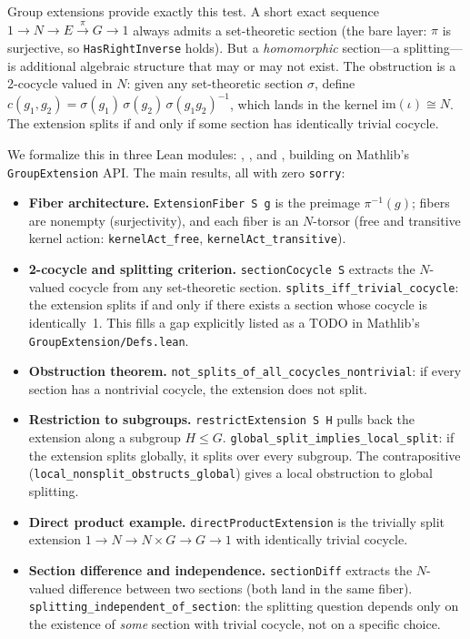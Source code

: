 \documentclass[11pt]{article}
\begin{document}
Group extensions provide exactly this test. A short exact sequence
$1 \to N \to E \xrightarrow{\pi} G \to 1$ always admits a set-theoretic section
(the bare layer: $\pi$ is surjective, so \texttt{HasRightInverse} holds). But a
\emph{homomorphic} section---a splitting---is additional algebraic structure that may or may
not exist. The obstruction is a 2-cocycle valued in $N$: given any set-theoretic section
$\sigma$, define $c(g_1,g_2) = \sigma(g_1)\,\sigma(g_2)\,\sigma(g_1 g_2)^{-1}$, which
lands in the kernel $\mathrm{im}(\iota) \cong N$. The extension splits if and only if
some section has identically trivial cocycle.

We formalize this in three Lean modules:\linebreak
{},\linebreak
{}, and\linebreak
{},\linebreak
building on Mathlib's \texttt{GroupExtension} API. The main results, all with zero
\texttt{sorry}:

\begin{itemize}[leftmargin=2em]
  \item \textbf{Fiber architecture.} \texttt{ExtensionFiber S g} is the preimage
    $\pi^{-1}(g)$; fibers are nonempty (surjectivity), and each fiber is an $N$-torsor
    (free and transitive kernel action: \texttt{kernelAct\_free},
    \texttt{kernelAct\_transitive}).
  \item \textbf{2-cocycle and splitting criterion.} \texttt{sectionCocycle S} extracts the
    $N$-valued cocycle from any set-theoretic section. \texttt{splits\_iff\_trivial\_cocycle}:
    the extension splits if and only if there exists a section whose cocycle is identically~1.
    This fills a gap explicitly listed as a TODO in Mathlib's
    \texttt{GroupExtension/Defs.lean}.
  \item \textbf{Obstruction theorem.} \texttt{not\_splits\_of\_all\_cocycles\_nontrivial}:
    if every section has a nontrivial cocycle, the extension does not split.
  \item \textbf{Restriction to subgroups.} \texttt{restrictExtension S H} pulls back the
    extension along a subgroup $H \le G$.
    \texttt{global\_split\_implies\_local\_split}: if the extension splits globally, it
    splits over every subgroup. The contrapositive
    (\texttt{local\_nonsplit\_obstructs\_global}) gives a local obstruction to global
    splitting.
  \item \textbf{Direct product example.} \texttt{directProductExtension} is the trivially
    split extension $1 \to N \to N \times G \to G \to 1$ with identically trivial cocycle.
  \item \textbf{Section difference and independence.} \texttt{sectionDiff} extracts the
    $N$-valued difference between two sections (both land in the same fiber).
    \texttt{splitting\_independent\_of\_section}: the splitting question depends only on
    the existence of \emph{some} section with trivial cocycle, not on a specific choice.
\end{itemize}
\end{document}
